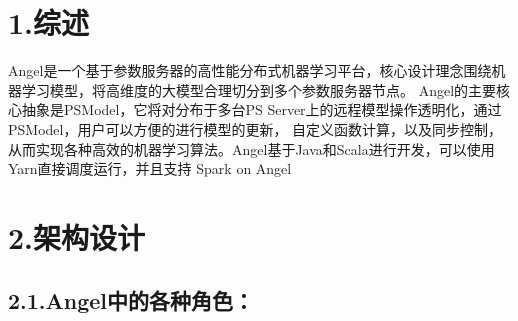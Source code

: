 \documentclass{article}
\begin{document}
\mdxtitleblockstart{}
\mdxauthorstart{}
\mdxauthorend\mdtitleauthorrunning{}{}\mdxtitleblockend%

\section{1.\hspace*{0.5em}综述}\label{section}%

\noindent{}\hspace*{1em}\hspace*{1em}Angel是一个基于参数服务器的高性能分布式机器学习平台，核心设计理念围绕机器学习模型，将高维度的大模型合理切分到多个参数服务器节点。
Angel的主要核心抽象是PSModel，它将对分布于多台PS Server上的远程模型操作透明化，通过PSModel，用户可以方便的进行模型的更新，
自定义函数计算，以及同步控制，从而实现各种高效的机器学习算法。Angel基于Java和Scala进行开发，可以使用Yarn直接调度运行，并且支持
Spark on Angel%

\section{2.\hspace*{0.5em}架构设计}\label{section}%

\subsection{2.1.\hspace*{0.5em}Angel中的各种角色：}\label{sec-angel}%
\end{document}
